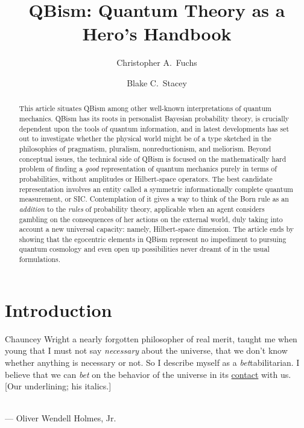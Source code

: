 \documentclass[aps,pra,superscriptaddress,12pt,tightenlines,nofootinbib]{revtex4-2}
\begin{document}
\title{QBism: Quantum Theory as a Hero's Handbook}
\author{Christopher A.\ Fuchs}
\author{Blake C.\ Stacey}


\begin{abstract}
This article situates QBism among other well-known interpretations of quantum mechanics.  QBism has its roots in personalist Bayesian probability theory, is crucially dependent upon the tools of quantum information, and in latest developments has set out to investigate whether the physical world might be of a type sketched in the philosophies of pragmatism, pluralism, nonreductionism, and meliorism.  Beyond conceptual issues, the technical side of QBism is focused on the mathematically hard problem of finding a {\it good\/} representation of quantum mechanics purely in terms of probabilities, without amplitudes or Hilbert-space operators.  The best candidate representation involves an entity called a symmetric informationally complete quantum measurement, or SIC\@.  Contemplation of it gives a way to think of the Born rule as an {\it addition\/} to the {\it rules\/} of probability theory, applicable when an agent considers gambling on the consequences of her actions on the external world, duly taking into account a new universal capacity:  namely, Hilbert-space dimension.  The article ends by showing that the egocentric elements in QBism represent no impediment to pursuing quantum cosmology and even open up possibilities never dreamt of in the usual formulations.
\end{abstract}

\maketitle


\section{Introduction}

\begin{flushright}
\baselineskip=13pt
\parbox{2.8in}{\baselineskip=13pt\small
Chauncey Wright a nearly forgotten philosopher of real merit, taught me when young that I must not say {\it necessary\/} about the universe, that we don't know whether anything is necessary or not.  So I describe myself as a {\it bet\/}tabilitarian.  I believe that we can {\it bet\/} on the behavior of the universe in its \underline{contact} with us. [Our underlining; his italics.]}
\medskip\\
\small --- Oliver Wendell Holmes, Jr.
\end{flushright}
\end{document}
